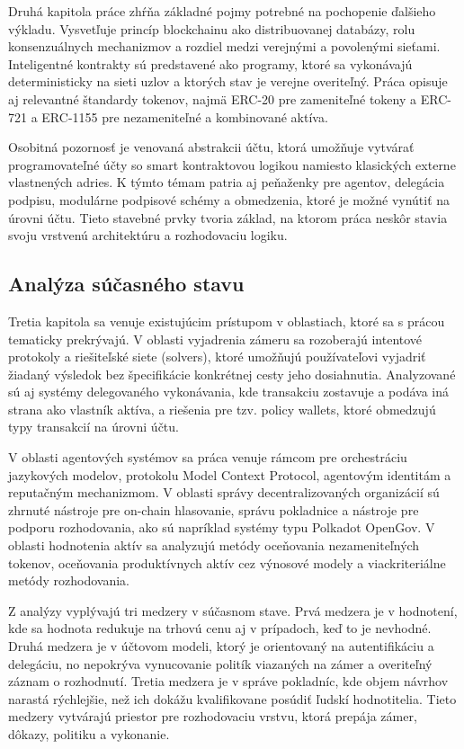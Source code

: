 Druhá kapitola práce zhŕňa základné pojmy potrebné na pochopenie ďalšieho výkladu. Vysvetľuje princíp blockchainu ako distribuovanej databázy, rolu konsenzuálnych mechanizmov a rozdiel medzi verejnými a povolenými sieťami. Inteligentné kontrakty sú predstavené ako programy, ktoré sa vykonávajú deterministicky na sieti uzlov a ktorých stav je verejne overiteľný. Práca opisuje aj relevantné štandardy tokenov, najmä ERC-20 pre zameniteľné tokeny a ERC-721 a ERC-1155 pre nezameniteľné a kombinované aktíva.

Osobitná pozornosť je venovaná abstrakcii účtu, ktorá umožňuje vytvárať programovateľné účty so smart kontraktovou logikou namiesto klasických externe vlastnených adries. K týmto témam patria aj peňaženky pre agentov, delegácia podpisu, modulárne podpisové schémy a obmedzenia, ktoré je možné vynútiť na úrovni účtu. Tieto stavebné prvky tvoria základ, na ktorom práca neskôr stavia svoju vrstvenú architektúru a rozhodovaciu logiku.

\subsection{Analýza súčasného stavu}

Tretia kapitola sa venuje existujúcim prístupom v oblastiach, ktoré sa s prácou tematicky prekrývajú. V oblasti vyjadrenia zámeru sa rozoberajú intentové protokoly a riešiteľské siete (solvers), ktoré umožňujú používateľovi vyjadriť žiadaný výsledok bez špecifikácie konkrétnej cesty jeho dosiahnutia. Analyzované sú aj systémy delegovaného vykonávania, kde transakciu zostavuje a podáva iná strana ako vlastník aktíva, a riešenia pre tzv. policy wallets, ktoré obmedzujú typy transakcií na úrovni účtu.

V oblasti agentových systémov sa práca venuje rámcom pre orchestráciu jazykových modelov, protokolu Model Context Protocol, agentovým identitám a reputačným mechanizmom. V oblasti správy decentralizovaných organizácií sú zhrnuté nástroje pre on-chain hlasovanie, správu pokladnice a nástroje pre podporu rozhodovania, ako sú napríklad systémy typu Polkadot OpenGov. V oblasti hodnotenia aktív sa analyzujú metódy oceňovania nezameniteľných tokenov, oceňovania produktívnych aktív cez výnosové modely a viackriteriálne metódy rozhodovania.

Z analýzy vyplývajú tri medzery v súčasnom stave. Prvá medzera je v hodnotení, kde sa hodnota redukuje na trhovú cenu aj v prípadoch, keď to je nevhodné. Druhá medzera je v účtovom modeli, ktorý je orientovaný na autentifikáciu a delegáciu, no nepokrýva vynucovanie politík viazaných na zámer a overiteľný záznam o rozhodnutí. Tretia medzera je v správe pokladníc, kde objem návrhov narastá rýchlejšie, než ich dokážu kvalifikovane posúdiť ľudskí hodnotitelia. Tieto medzery vytvárajú priestor pre rozhodovaciu vrstvu, ktorá prepája zámer, dôkazy, politiku a vykonanie.

